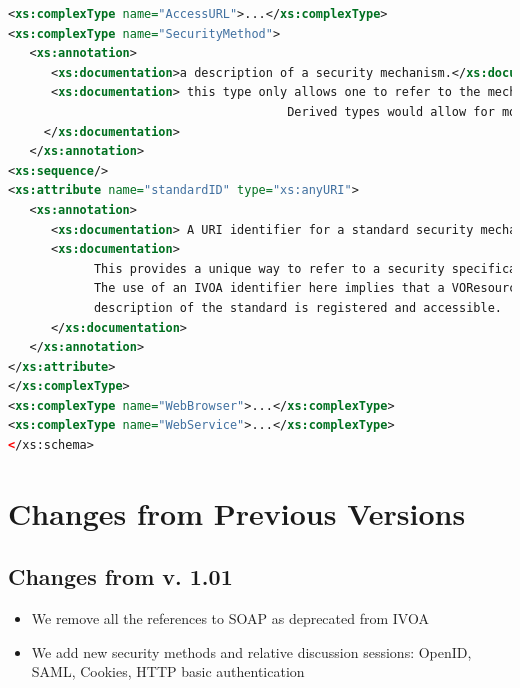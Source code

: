 \documentclass[11pt,a4paper]{ivoa}
\begin{document}
\begin{lstlisting}[language=xml,basicstyle=\footnotesize]
<xs:complexType name="AccessURL">...</xs:complexType>
<xs:complexType name="SecurityMethod">
   <xs:annotation>
      <xs:documentation>a description of a security mechanism.</xs:documentation>
      <xs:documentation> this type only allows one to refer to the mechanism via a URI.
                                       Derived types would allow for more metadata.
     </xs:documentation>
   </xs:annotation>
<xs:sequence/>
<xs:attribute name="standardID" type="xs:anyURI">
   <xs:annotation>
      <xs:documentation> A URI identifier for a standard security mechanism. </xs:documentation>
      <xs:documentation>
            This provides a unique way to refer to a security specification standard.
            The use of an IVOA identifier here implies that a VOResource
            description of the standard is registered and accessible.
      </xs:documentation>
   </xs:annotation>
</xs:attribute>
</xs:complexType>
<xs:complexType name="WebBrowser">...</xs:complexType>
<xs:complexType name="WebService">...</xs:complexType>
</xs:schema>
\end{lstlisting}


\section{Changes from Previous Versions}


\subsection {Changes from v. 1.01}
\begin{itemize}
\item We remove all the references to SOAP as deprecated from IVOA
\item We add new security methods and relative discussion sessions:
OpenID, SAML, Cookies, HTTP basic authentication
\end{itemize}



\end{document}
